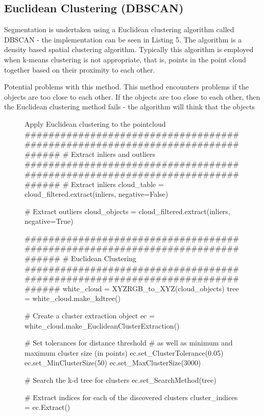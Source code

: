 \documentclass[a4paper]{article}
\begin{document}
\newpage

\subsection{Euclidean Clustering (DBSCAN)}
Segmentation is undertaken using a Euclidean clustering algorithm called DBSCAN - the implementation can be seen in Listing 5. The algorithm is a density based spatial clustering algorithm. Typically this algorithm is employed when k-means clustering is not appropriate, that is,  points in the point cloud together based on their proximity to each other.

Potential problems with this method. This method encounters problems if the objects are too close to each other. If the objects are too close to each other, then the Euclidean clustering method fails - the algorithm will think that the objects 

\vspace{0.5cm}

\begin{figure}[h]\scriptsize
\begin{sexylisting}{Apply Euclidean clustering to the pointcloud}
##############################################################################
    # Extract inliers and outliers
##############################################################################
    # Extract inliers
    cloud_table = cloud_filtered.extract(inliers, negative=False)

    # Extract outliers
    cloud_objects = cloud_filtered.extract(inliers, negative=True)


##############################################################################
    # Euclidean Clustering
##############################################################################
    white_cloud = XYZRGB_to_XYZ(cloud_objects)
    tree = white_cloud.make_kdtree()

    # Create a cluster extraction object
    ec = white_cloud.make_EuclideanClusterExtraction()

    # Set tolerances for distance threshold
    # as well as minimum and maximum cluster size (in points)
    ec.set_ClusterTolerance(0.05)
    ec.set_MinClusterSize(50)
    ec.set_MaxClusterSize(3000)

    # Search the k-d tree for clusters
    ec.set_SearchMethod(tree)

    # Extract indices for each of the discovered clusters
    cluster_indices = ec.Extract()
\end{sexylisting}
\end{figure}
\end{document}
